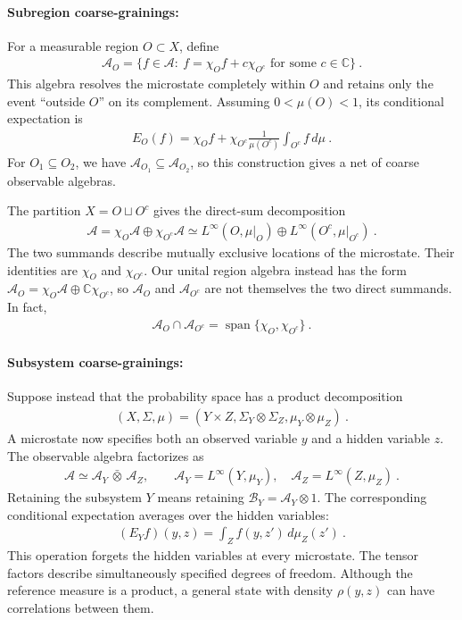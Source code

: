 \documentclass[a4paper,11pt]{article}
\theoremstyle{definition}
\newcommand{\mA}{\mathcal{A}}
\newcommand{\mB}{\mathcal{B}}
\begin{document}
\paragraph{Subregion coarse-grainings:}
For a measurable region $O\subset X$, define
\begin{align}
    \mA_O=\{f\in\mA:\ f=\chi_O f+c\chi_{O^c}\text{ for some }c\in\mathbb C\}\ .
\end{align}
This algebra resolves the microstate completely within $O$ and retains only the event ``outside $O$'' on its complement. Assuming $0<\mu(O)<1$, its conditional expectation is
\begin{align}
    E_O(f)=\chi_O f+
    \chi_{O^c}\frac{1}{\mu(O^c)}\int_{O^c}f\,d\mu\ .
\end{align}
For $O_1\subseteq O_2$, we have $\mA_{O_1}\subseteq\mA_{O_2}$, so this construction gives a net of coarse observable algebras.

The partition $X=O\sqcup O^c$ gives the direct-sum decomposition
\begin{align}
    \mA=\chi_O\mA\oplus\chi_{O^c}\mA
    \simeq L^\infty(O,\mu|_O)\oplus L^\infty(O^c,\mu|_{O^c})\ .
\end{align}
The two summands describe mutually exclusive locations of the microstate. Their identities are $\chi_O$ and $\chi_{O^c}$. Our unital region algebra instead has the form $\mA_O=\chi_O\mA\oplus\mathbb C\chi_{O^c}$, so $\mA_O$ and $\mA_{O^c}$ are not themselves the two direct summands. In fact,
\begin{align}
    \mA_O\cap\mA_{O^c}=\operatorname{span}\{\chi_O,\chi_{O^c}\}\ .
\end{align}

\paragraph{Subsystem coarse-grainings:}
Suppose instead that the probability space has a product decomposition
\begin{align}
    (X,\Sigma,\mu)=(Y\times Z,\Sigma_Y\otimes\Sigma_Z,\mu_Y\otimes\mu_Z)\ .
\end{align}
A microstate now specifies both an observed variable $y$ and a hidden variable $z$. The observable algebra factorizes as
\begin{align}
    \mA\simeq\mA_Y\,\bar\otimes\,\mA_Z,
    \qquad \mA_Y=L^\infty(Y,\mu_Y),\quad
    \mA_Z=L^\infty(Z,\mu_Z)\ .
\end{align}
Retaining the subsystem $Y$ means retaining $\mB_Y=\mA_Y\otimes 1$. The corresponding conditional expectation averages over the hidden variables:
\begin{align}
    (E_Y f)(y,z)=\int_Z f(y,z')\,d\mu_Z(z')\ .
\end{align}
This operation forgets the hidden variables at every microstate. The tensor factors describe simultaneously specified degrees of freedom. Although the reference measure is a product, a general state with density $\rho(y,z)$ can have correlations between them.
\end{document}
